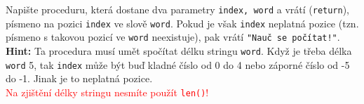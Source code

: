 \question[70]
Napište proceduru, která dostane dva parametry \texttt{index, word} a vrátí
(\texttt{return}),
písmeno na pozici \texttt{index} ve slově \texttt{word}.
Pokud je však
\texttt{index} neplatná pozice (tzn. písmeno s takovou pozicí ve
\texttt{word}
neexistuje), pak vrátí \texttt{"Nauč se počítat!"}.\\
\textbf{Hint:} Ta procedura musí umět spočítat délku stringu \texttt{word}. Když
je
třeba délka \texttt{word} 5, tak \texttt{index} může být buď kladné číslo
od 0
do 4 nebo záporné číslo od -5 do -1. Jinak je to neplatná pozice.\\
\textcolor{red}{Na zjištění délky stringu nesmíte použít \texttt{len()}!}